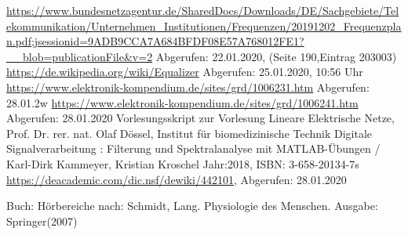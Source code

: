 \begin{thebibliography}{99}

 \url{https://www.bundesnetzagentur.de/SharedDocs/Downloads/DE/Sachgebiete/Telekommunikation/Unternehmen_Institutionen/Frequenzen/20191202_Frequenzplan.pdf;jsessionid=9ADB9CCA7A684BFDF08E57A768012FE1?__blob=publicationFile&v=2} Abgerufen: 22.01.2020, (Seite 190,Eintrag 203003)
 \url{https://de.wikipedia.org/wiki/Equalizer} Abgerufen: 25.01.2020, 10:56 Uhr
 \url{https://www.elektronik-kompendium.de/sites/grd/1006231.htm}
Abgerufen: 28.01.2w
 \url{https://www.elektronik-kompendium.de/sites/grd/1006241.htm} Abgerufen: 28.01.2020
 Vorlesungsskript zur Vorlesung Lineare Elektrische Netze, Prof. Dr. rer. nat. Olaf Dössel, Institut für biomedizinische Technik
 Digitale Signalverarbeitung : Filterung und Spektralanalyse mit MATLAB-Übungen / Karl-Dirk Kammeyer, Kristian Kroschel Jahr:2018, ISBN: 3-658-20134-7s
 \url{https://deacademic.com/dic.nsf/dewiki/442101}, Abgerufen: 28.01.2020


 Buch: Hörbereiche nach: Schmidt, Lang. Physiologie des Menschen. Ausgabe: Springer(2007)






\end{thebibliography}

